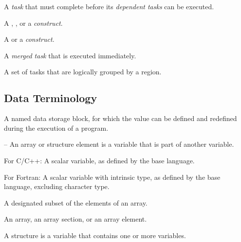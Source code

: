 \glossarydefstart
A \emph{task} that must complete before its \emph{dependent tasks} can be executed.
\glossarydefend

\glossarydefstart
A , , or a  \emph{construct}.
\glossarydefend
\bigskip

\glossarydefstart
A  or a  \emph{construct}.
\glossarydefend
\bigskip

\glossarydefstart
A \emph{merged task} that is executed immediately.
\glossarydefend

\glossarydefstart
A set of tasks that are logically grouped by a  region.
\glossarydefend

\subsection{Data Terminology}
\label{subsec:Data Terminology} 
\glossarydefstart
A named data storage block, for which the value can be defined and redefined during the 
execution of a program.

\begin{adjustwidth}{-0.75in}{0in}
\notestart
\noteheader – An array or structure element is a variable that is part of another variable.
\noteend
\end{adjustwidth}
\glossarydefend

\glossarydefstart
For C/C++:
\nopagebreak
A scalar variable, as defined by the base language.

For Fortran:
\nopagebreak
A scalar variable with intrinsic type, as defined by the base language,
excluding character type.
\glossarydefend


\glossarydefstart
A designated subset of the elements of an array. 
\glossarydefend

\glossarydefstart
An array, an array section, or an array element.
\glossarydefend

\glossarydefstart
A structure is a variable that contains one or more variables. 


